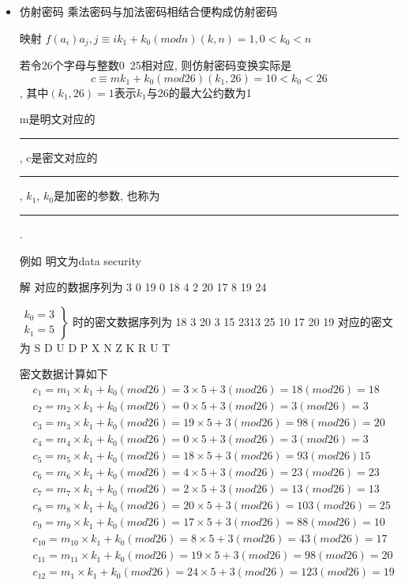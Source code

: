 \documentclass[UTF8]{ctexart}
\newcommand\hl{\bgroup\markoverwith
  {\textcolor{yellow}{\rule[-.5ex]{2pt}{2.5ex}}}\ULon}
\begin{document}
\begin{itemize}
        \item 仿射密码
        乘法密码与加法密码相结合便构成仿射密码

        映射 $f(a_i)a_j, j\equiv ik_1+k_0(mod n) (k, n)=1, 0<k_0<n$

        若令26个字母与整数0~25相对应, 则仿射密码变换实际是
        $$c\equiv mk_1 + k_0(mod 26) (k_1, 26)=1 0<k_0<26$$, 其中$(k_1, 26)=1$表示$k_1$与26的最大公约数为1

        m是明文对应的\hl{明文数据}, c是密文对应的\hl{密文数据}, $k_1$, $k_0$是加密的参数, 也称为\hl{密钥}.

        例如 明文为data security

        解 对应的数据序列为 3 0 19 0 18 4 2 20 17 8 19 24

        $\left. \begin{array}{c}{k_0=3}\\ {k_1=5} \end{array}\right \}$
        时的密文数据序列为 18 3 20 3 15 2313 25 10 17 20 19
        对应的密文为 S D U D P X N Z K R U T

        密文数据计算如下
        $$
        \begin{aligned}
            &c_1=m_1\times k_1 + k_0(mod 26)=3\times 5 + 3(mod 26)=18(mod26)=18\\
            &c_2=m_2\times k_1 + k_0(mod 26)=0\times 5 + 3(mod 26)=3(mod26)=3\\
            &c_3=m_3\times k_1 + k_0(mod 26)=19\times 5 + 3(mod 26)=98(mod26)=20\\
            &c_4=m_4\times k_1 + k_0(mod 26)=0\times 5 + 3(mod 26)=3(mod26)=3\\
            &c_5=m_5\times k_1 + k_0(mod 26)=18\times 5 + 3(mod 26)=93(mod26)15\\
            &c_6=m_6\times k_1 + k_0(mod 26)=4\times 5 + 3(mod 26)=23(mod26)=23\\
            &c_7=m_7\times k_1 + k_0(mod 26)=2\times 5 + 3(mod 26)=13(mod26)=13\\
            &c_8=m_8\times k_1 + k_0(mod 26)=20\times 5 + 3(mod 26)=103(mod26)=25\\
            &c_9=m_9\times k_1 + k_0(mod 26)=17\times 5 + 3(mod 26)=88(mod26)=10\\
            &c_10=m_10\times k_1 + k_0(mod 26)=8\times 5 + 3(mod 26)=43(mod26)=17\\
            &c_11=m_11\times k_1 + k_0(mod 26)=19\times 5 + 3(mod 26)=98(mod26)=20\\
            &c_12=m_1\times k_1 + k_0(mod 26)=24\times 5 + 3(mod 26)=123(mod26)=19
        \end{aligned}
        $$


\end{itemize}
\end{document}
